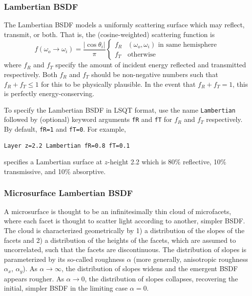 \documentclass[
    twoside,
    twocolumn,
    letterpaper,
    10pt]{article}
\newcommand\namett[2]{{\color{code#1}\texttt{#2}}}
\begin{document}
\subsubsection{Lambertian BSDF}
\label{sec:doc-layers-lambertian}

The Lambertian BSDF models a uniformly scattering surface which 
may reflect, transmit, or both. That is, the (cosine-weighted)
scattering function is
\begin{equation*}
    f(\omega_o\to\omega_i) =
    \frac{|\cos{\theta_i}|}{\pi}
    \begin{cases}
        f_R & \text{$(\omega_o, \omega_i)$ in same hemisphere}\\
        f_T & \text{otherwise}
    \end{cases}
\end{equation*}
where $f_R$ and $f_T$ specify the amount of incident energy 
reflected and transmitted respectively. Both $f_R$ and $f_T$ should
be non-negative numbers such that $f_R + f_T \le 1$ for this to be
physically plausible. In the event that $f_R + f_T = 1$, this is
perfectly energy-conserving.

To specify the Lambertian BSDF in LSQT format, use the name
\namett{purple}{Lambertian} followed by (optional) keyword arguments 
\texttt{fR} and \texttt{fT} for $f_R$ and $f_T$ respectively. 
By default, \texttt{fR=1} and \texttt{fT=0}.
For example,
\begin{lstlisting}
Layer z=2.2 Lambertian fR=0.8 fT=0.1
\end{lstlisting}
specifies a Lambertian surface at $z$-height 2.2 which is 80\% reflective,
10\% transmissive, and 10\% absorptive. 

\subsubsection{Microsurface Lambertian BSDF}
\label{sec:doc-layers-microsurface-lambertian}

A microsurface is thought 
to be an infinitesimally thin cloud of microfacets, where each facet 
is thought to scatter light according to another, simpler BSDF. The 
cloud is characterized geometrically by 1) a distribution of the
slopes of the facets and 2) a distribution of the heights of the facets,
which are assumed to uncorrelated, such that the facets are discontinuous. 
The distribution of slopes is parameterized by its so-called roughness
$\alpha$ (more generally, anisotropic roughness $\alpha_x$, $\alpha_y$).
As $\alpha\to\infty$, the distribution of slopes widens and the emergent
BSDF appears rougher. As $\alpha\to0$, the distribution of slopes collapses,
recovering the initial, simpler BSDF in the limiting case $\alpha=0$.
\end{document}
